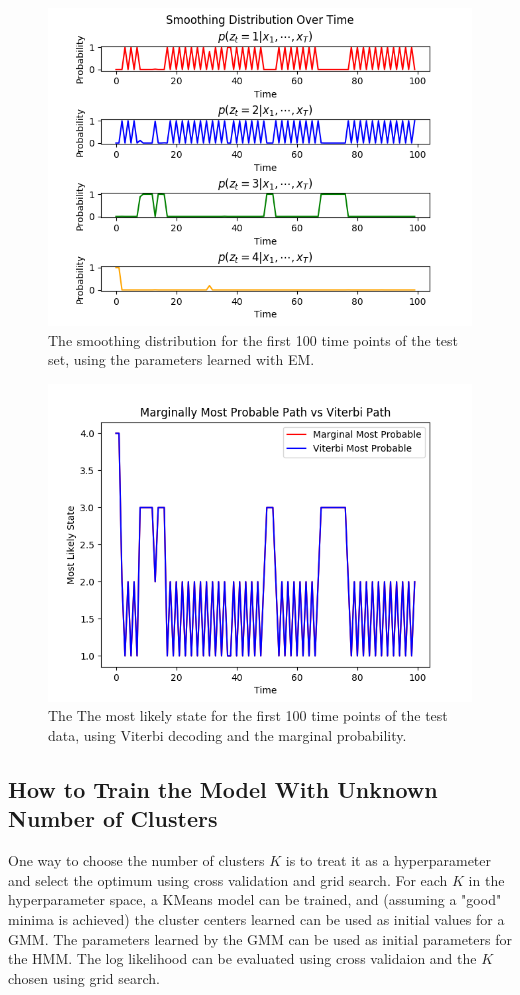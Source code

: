 \documentclass[paper=a4, fontsize=11pt]{scrartcl} %
\numberwithin{equation}{section} %
\numberwithin{figure}{section} %
\numberwithin{table}{section} %
\begin{document}
\begin{figure}
	\includegraphics[width=.9\linewidth]{smoothing_dist_EM.png}
	\caption{The smoothing distribution for the first 100 time points of the test set, using the parameters learned with EM.}
\end{figure}

\begin{figure}
	\includegraphics[width=.9\linewidth]{marg_vs_viterbi.png}
	\caption{The The most likely state for the first 100 time points of the test data, using Viterbi decoding and the marginal probability.}
\end{figure}

\subsection{How to Train the Model With Unknown Number of Clusters}
One way to choose the number of clusters \(K\) is to treat it as a hyperparameter and select the optimum using cross validation and grid search. For each \(K\) in the hyperparameter space, a KMeans model can be trained, and (assuming a "good" minima is achieved) the cluster centers learned can be used as initial values for a GMM. The parameters learned by the GMM can be used as initial parameters for the HMM. The log likelihood can be evaluated using cross validaion and the \(K\) chosen using grid search.
\end{document}
